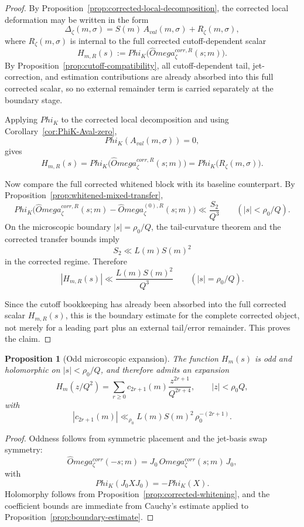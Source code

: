 \documentclass[11pt,a4paper]{amsart}
\def\Omega{Omega}%
\def\Phi{Phi}%
\def\corr{corr}%
\def\val{val}%
\theoremstyle{plain}
\newtheorem{proposition}[theorem]{Proposition}
\theoremstyle{definition}
\newcommand{\val}{\mathrm{val}}
\newcommand{\corr}{\mathrm{corr}}
\begin{document}
\begin{proof}
By Proposition~\ref{prop:corrected-local-decomposition}, the corrected local
deformation may be written in the form
\[
\Delta_\zeta(m,\sigma)
=
S(m)\,A_{\val}(m,\sigma)+R_\zeta(m,\sigma),
\]
where $R_\zeta(m,\sigma)$ is internal to the full corrected cutoff-dependent
scalar
\[
H_{m,R}(s):=\Phi_K\!\bigl(\widehat\Omega_\zeta^{\corr,R}(s;m)\bigr).
\]
By Proposition~\ref{prop:cutoff-compatibility}, all cutoff-dependent tail,
jet-correction, and estimation contributions are already absorbed into this
full corrected scalar, so no external remainder term is carried separately at
the boundary stage.

Applying $\Phi_K$ to the corrected local decomposition and using
Corollary~\ref{cor:PhiK-Aval-zero},
\[
\Phi_K(A_{\val}(m,\sigma))=0,
\]
gives
\[
H_{m,R}(s)
=
\Phi_K\!\bigl(\widehat\Omega_\zeta^{\corr,R}(s;m)\bigr)
=
\Phi_K\!\bigl(R_\zeta(m,\sigma)\bigr).
\]

Now compare the full corrected whitened block with its baseline counterpart.
By Proposition~\ref{prop:whitened-mixed-transfer},
\[
\Phi_K\!\bigl(\widehat\Omega_\zeta^{\corr,R}(s;m)-\widehat\Omega_\zeta^{(0),R}(s;m)\bigr)
\ll
\frac{S_2}{Q^3}
\qquad (|s|<\rho_0/Q).
\]
On the microscopic boundary $|s|=\rho_0/Q$, the tail-curvature theorem and
the corrected transfer bounds imply
\[
S_2\ll L(m)S(m)^2
\]
in the corrected regime. Therefore
\[
|H_{m,R}(s)|
\ll
\frac{L(m)S(m)^2}{Q^3}
\qquad (|s|=\rho_0/Q).
\]

Since the cutoff bookkeeping has already been absorbed into the full corrected
scalar $H_{m,R}(s)$, this is the boundary estimate for the complete corrected
object, not merely for a leading part plus an external tail/error remainder.
This proves the claim.
\end{proof}

\begin{proposition}[Odd microscopic expansion]
\label{prop:odd-expansion}
The function $H_m(s)$ is odd and holomorphic on $|s|<\rho_0/Q$, and therefore
admits an expansion
\[
H_m(z/Q^2)
=
\sum_{r\ge 0} c_{2r+1}(m)\frac{z^{2r+1}}{Q^{2r+4}},
\qquad |z|<\rho_0Q,
\]
with
\[
|c_{2r+1}(m)|\ll_{\rho_0}L(m)S(m)^2\,\rho_0^{-(2r+1)}.
\]
\end{proposition}

\begin{proof}
Oddness follows from symmetric placement and the jet-basis swap symmetry:
\[
\widehat\Omega_\zeta^{\corr}(-s;m)=J_0\,\widehat\Omega_\zeta^{\corr}(s;m)\,J_0,
\]
with
\[
\Phi_K(J_0XJ_0)=-\Phi_K(X).
\]
Holomorphy follows from Proposition~\ref{prop:corrected-whitening}, and the
coefficient bounds are immediate from Cauchy's estimate applied to
Proposition~\ref{prop:boundary-estimate}.
\end{proof}
\end{document}
